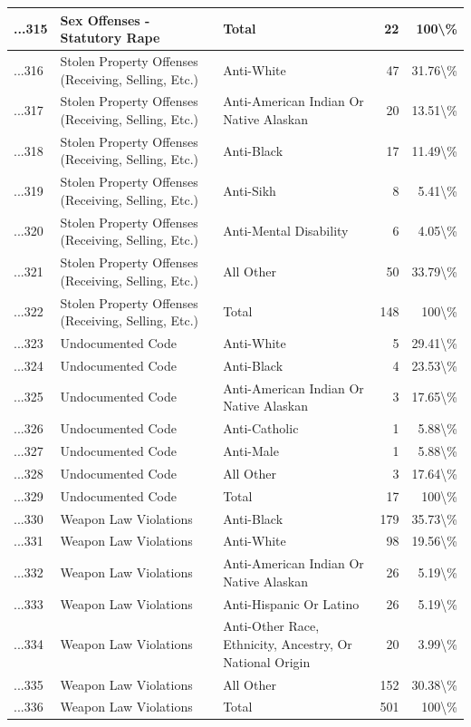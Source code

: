 \documentclass[
]{krantz}
\begin{document}
\begin{longtable}[t]{l|l|l|r|r}
\hline
...315 & Sex Offenses - Statutory Rape & Total & 22 & 100\textbackslash{}\%\\
\hline
...316 & Stolen Property Offenses (Receiving, Selling, Etc.) & Anti-White & 47 & 31.76\textbackslash{}\%\\
\hline
...317 & Stolen Property Offenses (Receiving, Selling, Etc.) & Anti-American Indian Or Native Alaskan & 20 & 13.51\textbackslash{}\%\\
\hline
...318 & Stolen Property Offenses (Receiving, Selling, Etc.) & Anti-Black & 17 & 11.49\textbackslash{}\%\\
\hline
...319 & Stolen Property Offenses (Receiving, Selling, Etc.) & Anti-Sikh & 8 & 5.41\textbackslash{}\%\\
\hline
...320 & Stolen Property Offenses (Receiving, Selling, Etc.) & Anti-Mental Disability & 6 & 4.05\textbackslash{}\%\\
\hline
...321 & Stolen Property Offenses (Receiving, Selling, Etc.) & All Other & 50 & 33.79\textbackslash{}\%\\
\hline
...322 & Stolen Property Offenses (Receiving, Selling, Etc.) & Total & 148 & 100\textbackslash{}\%\\
\hline
...323 & Undocumented Code & Anti-White & 5 & 29.41\textbackslash{}\%\\
\hline
...324 & Undocumented Code & Anti-Black & 4 & 23.53\textbackslash{}\%\\
\hline
...325 & Undocumented Code & Anti-American Indian Or Native Alaskan & 3 & 17.65\textbackslash{}\%\\
\hline
...326 & Undocumented Code & Anti-Catholic & 1 & 5.88\textbackslash{}\%\\
\hline
...327 & Undocumented Code & Anti-Male & 1 & 5.88\textbackslash{}\%\\
\hline
...328 & Undocumented Code & All Other & 3 & 17.64\textbackslash{}\%\\
\hline
...329 & Undocumented Code & Total & 17 & 100\textbackslash{}\%\\
\hline
...330 & Weapon Law Violations & Anti-Black & 179 & 35.73\textbackslash{}\%\\
\hline
...331 & Weapon Law Violations & Anti-White & 98 & 19.56\textbackslash{}\%\\
\hline
...332 & Weapon Law Violations & Anti-American Indian Or Native Alaskan & 26 & 5.19\textbackslash{}\%\\
\hline
...333 & Weapon Law Violations & Anti-Hispanic Or Latino & 26 & 5.19\textbackslash{}\%\\
\hline
...334 & Weapon Law Violations & Anti-Other Race, Ethnicity, Ancestry, Or National Origin & 20 & 3.99\textbackslash{}\%\\
\hline
...335 & Weapon Law Violations & All Other & 152 & 30.38\textbackslash{}\%\\
\hline
...336 & Weapon Law Violations & Total & 501 & 100\textbackslash{}\%\\
\hline
\end{longtable}
\end{document}
